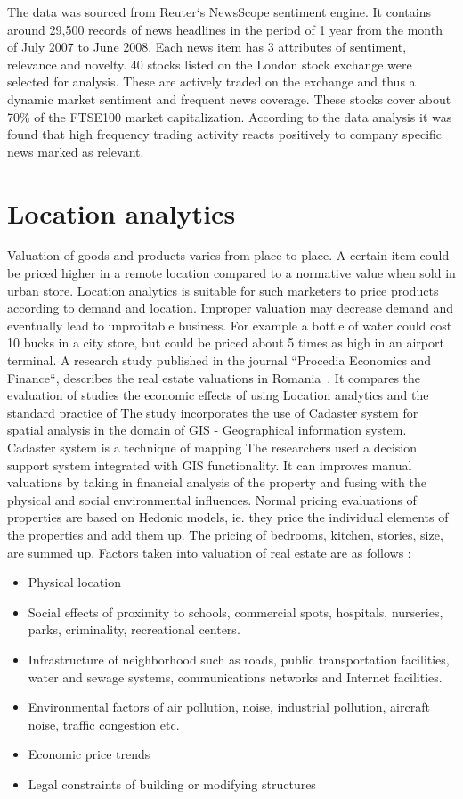 The data was sourced from Reuter`s NewsScope sentiment engine. It contains around 29,500 records of news headlines in the period of 1 year from the month of July 2007 to June 2008. Each news item has 3 attributes of sentiment, relevance and novelty. 40 stocks listed on the London stock exchange were selected for analysis. These are actively traded on the exchange and thus a dynamic market sentiment and frequent news coverage. These stocks cover about 70\% of the FTSE100 market capitalization. 
According to the data analysis it was found that high frequency trading activity reacts positively to company specific news marked as relevant.

\section{Location analytics}
Valuation of goods and products varies from place to place. A certain item could be priced higher in a remote location compared to a normative value when sold in urban store.
Location analytics is suitable for such marketers to price products according to demand and location. Improper valuation may decrease demand and eventually lead to unprofitable business. For example a bottle of water could cost 10 bucks in a city store, but could be priced about 5 times as high in an airport terminal. 
A research study published in the journal ``Procedia Economics and Finance``, describes the real estate valuations in Romania~. It compares the evaluation of  studies the economic effects of using Location analytics and the standard practice of 
The study incorporates the use of Cadaster system for spatial analysis in the domain of GIS - Geographical information system. Cadaster system is a technique of mapping 
The researchers used a decision support system integrated with GIS functionality. It can improves manual valuations by taking in financial analysis of the property and fusing with the physical and social environmental influences.
Normal pricing evaluations of properties are based on Hedonic models, ie. they price the individual elements of the properties and add them up. The pricing of bedrooms, kitchen, stories, size, are summed up.
Factors taken into valuation of real estate are as follows :
\begin{itemize}
	\item Physical location 
	\item Social effects of proximity to schools, commercial spots, hospitals, nurseries, parks, criminality, recreational centers.
	\item Infrastructure of neighborhood such as roads, public transportation facilities, water and sewage systems, communications networks and Internet facilities.
	\item Environmental factors of air pollution, noise, industrial pollution, aircraft noise, traffic congestion etc.
	\item Economic price trends
	\item Legal constraints of building or modifying structures
\end{itemize}
